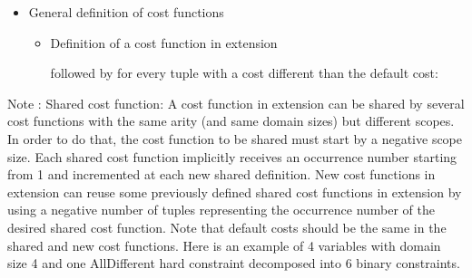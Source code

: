 \documentclass[letterpaper,10pt,openany,oneside,english]{sphinxmanual}
\begin{document}
\begin{fulllineitems}
\sphinxAtStartPar
\begin{itemize}
\item {} 
\sphinxAtStartPar
General definition of cost functions\begin{itemize}
\item {} 
\sphinxAtStartPar
Definition of a cost function in extension 
\begin{sphinxVerbatim}[commandchars=\\\{\}]
    
           
           
  
          
\end{sphinxVerbatim}
 followed by for every tuple with a cost different than the default cost: 
\begin{sphinxVerbatim}[commandchars=\\\{\}]
           
           
   
\end{sphinxVerbatim}


\end{itemize}


\end{itemize}


\sphinxAtStartPar
Note : Shared cost function: A cost function in extension can be shared by several cost functions with the same arity (and same domain sizes) but different scopes. In order to do that, the cost function to be shared must start by a negative scope size. Each shared cost function implicitly receives an occurrence number starting from 1 and incremented at each new shared definition. New cost functions in extension can reuse some previously defined shared cost functions in extension by using a negative number of tuples representing the occurrence number of the desired shared cost function. Note that default costs should be the same in the shared and new cost functions. Here is an example of 4 variables with domain size 4 and one AllDifferent hard constraint decomposed into 6 binary constraints.


\end{fulllineitems}
\end{document}
